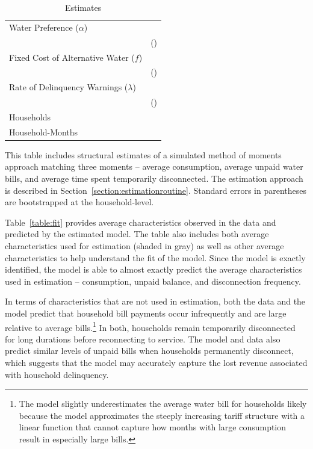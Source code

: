 \documentclass[12pt,table]{article}
\begin{document}
\begin{table}[h!]
\centering
\caption{Estimates}\label{table:estimates}
\begin{threeparttable}
\begin{tabular}{@{}l*{1}{c}@{}}
\toprule
Water Preference  ($\alpha$) &  \\
 &   (\unskip) \\[.4em]
Fixed Cost of Alternative Water ($f$) &   \\
 &    (\unskip) \\[.4em]
Rate of Delinquency Warnings ($\lambda$) &   \\
 &   (\unskip) \\[.8em]
Households &   \\
Household-Months &   \\
\bottomrule
\end{tabular}
\begin{tablenotes}
\item 
\footnotesize
This table includes structural estimates of a simulated method of moments approach matching three moments -- average consumption, average unpaid water bills, and average time spent temporarily disconnected.  The estimation approach is described in Section~\ref{section:estimationroutine}.  Standard errors in parentheses are bootstrapped at the household-level. 
\end{tablenotes}
\end{threeparttable}
\end{table}

Table~\ref{table:fit} provides average characteristics observed in the data and predicted by the estimated model.  The table also includes both average characteristics used for estimation (shaded in gray) as well as other average characteristics to help understand the fit of the model.  Since the model is exactly identified, the model is able to almost exactly predict the average characteristics used in estimation -- consumption, unpaid balance, and disconnection frequency.

In terms of characteristics that are not used in estimation, both the data and the model predict that household bill payments occur infrequently and are large relative to average bills.\footnote{The model slightly underestimates the average water bill for households likely because the model approximates the steeply increasing tariff structure with a linear function that cannot capture how months with large consumption result in especially large bills.}  In both, households remain temporarily disconnected for long durations before reconnecting to service.  The model and data also predict similar levels of unpaid bills when households permanently disconnect, which suggests that the model may accurately capture the lost revenue associated with household delinquency.
\end{document}
